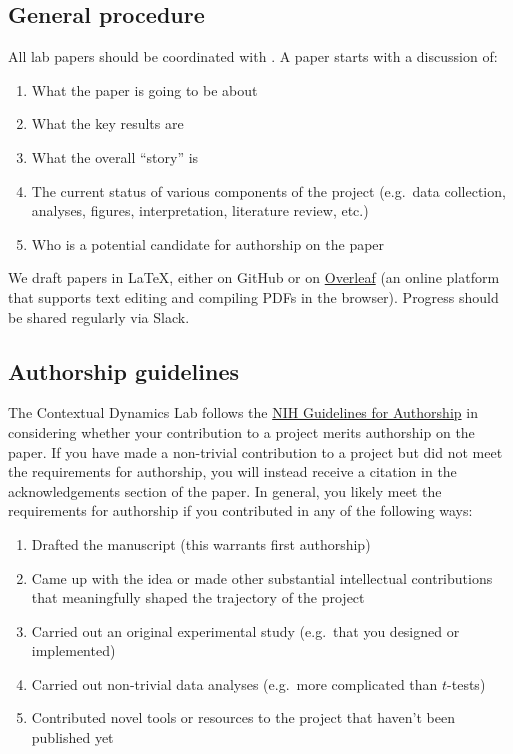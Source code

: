 \documentclass{tufte-book} %
\begin{document}
\subsection{General procedure}
All lab papers should be coordinated with \director.  A paper starts
with a discussion of:
\begin{enumerate}
\item What the paper is going to be about
\item What the key results are
\item What the overall ``story'' is
\item The current status of various components of the project
  (e.g.\ data collection, analyses, figures, interpretation,
  literature review, etc.)
\item Who is a potential candidate for authorship on the paper
\end{enumerate}

We draft papers in \LaTeX, either on GitHub or on \href{https://www.overleaf.com/}{Overleaf}
(an online platform that supports text editing and compiling PDFs in
the browser).  Progress should be shared regularly via Slack.

\subsection{Authorship guidelines}
  The Contextual Dynamics Lab follows
the
\href{https://oir.nih.gov/sites/default/files/uploads/sourcebook/documents/ethical_conduct/guidelines-authorship_contributions.pdf}{NIH
  Guidelines for Authorship} in considering whether your contribution
to a project merits authorship on the paper.  If you have made a
non-trivial contribution to a project but did not meet the
requirements for authorship, you will instead receive a citation in
the acknowledgements section of the paper.  In general, you likely meet the
requirements for authorship if you contributed in any of the following
ways:
\begin{enumerate}
\item Drafted the manuscript (this warrants first authorship)
\item Came up with the idea or made other substantial intellectual
  contributions that meaningfully shaped the trajectory of the project
\item Carried out an original experimental study (e.g.\ that you
  designed or implemented)
\item Carried out non-trivial data analyses (e.g.\ more complicated
  than $t$-tests)
\item Contributed novel tools or resources to the project that haven't
  been published yet
\end{enumerate}
\end{document}
